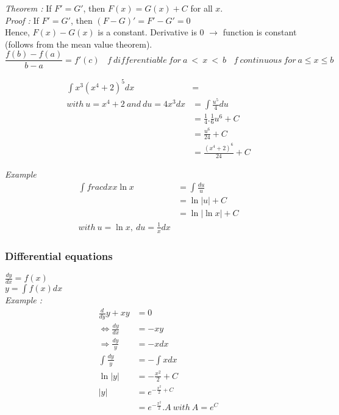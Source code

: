 \documentclass{article}
\begin{document}
    \textit{Theorem : } If $F' = G'$, then $F(x)=G(x)+C$ for all $x$.\\
    \textit{Proof :} If $F' = G'$, then $(F - G)' = F' - G' = 0$\\
    Hence, $F(x)-G(x)$ is a constant. Derivative is 0 $\rightarrow$ function is constant (follows from the mean value theorem).\\

    \[
    \label{Mean value theorem}
    \frac{f(b) - f(a)}{b-a} = f'(c)~ ~ ~ ~
    f ~differentiable ~for~ a~ < ~x ~< ~b ~ ~ ~ ~
    f ~continuous ~for~ a \leq x \leq b
    \]

    \begin{align*}
        \int x^3 (x^4 + 2)^5 dx &= \\
        with~ u = x^4 +2 ~and ~du = 4x^3 dx
        &= \int \frac{u^5}{4}du\\
        &= \frac{1}{4}.\frac{1}{6}u^6+C\\
        &= \frac{u^6}{24}+C\\
        &= \frac{(x^4 +2)^6}{24}+C
    \end{align*}

    \textit{Example}
    \begin{align*}
        \int frac{dx}{x\ln x} &= \int \frac{du}{u}\\
        &= \ln |u| + C\\
        &= \ln |\ln x| +C\\
        with~ u=\ln x, ~ du=\frac{1}{x}dx
    \end{align*}



    \subsubsection{Differential equations}

    $\frac{dy}{dx} = f(x)$\\
    $y = \int f(x)dx$\\

    \textit{Example :}\\
    \begin{align*}
        \frac{d}{dy}y + xy &= 0 \\
        \Leftrightarrow \frac{dy}{dx}&=-xy\\
        \Rightarrow \frac{dy}{y} &= -xdx\\
        \int \frac{dy}{y} &= -\int xdx \\
        \ln |y| &= - \frac{x^2}{2}+C\\
        |y| &= e^{-\frac{x^2}{2}+C} \\
        &= e^{-\frac{x^2}{2}}.A ~ with ~ A=e^C
    \end{align*}
\end{document}
